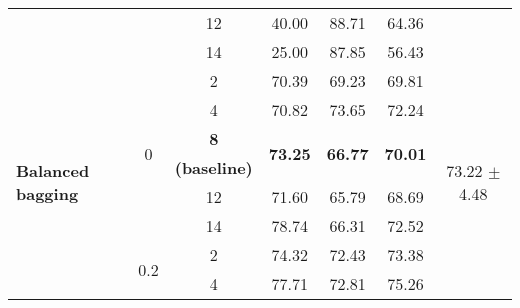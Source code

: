 \begin{sidewaystable}
\begin{adjustbox}{totalheight=0.85\textheight, width=\textwidth, keepaspectratio}
\begin{tabularx}{1.4\textwidth}{Xcccccc}
                                                       &                       & 12                       & 40.00                              & 88.71                           & 64.36                           &                                 \\ 
                                                       &                       & 14                       & 25.00                              & 87.85                           & 56.43                           &                                 \\ 
\multirow{18}{=}{\textbf{Balanced bagging}}            & \multirow{6}{*}{0}    & 2                        & 70.39                           & 69.23                           & 69.81                           & \multirow{18}{*}{73.22 $\pm$ 4.48} \\ 
                                                       &                       & 4                        & 70.82                           & 73.65                           & 72.24                           &                                 \\ 
                                                       &                       & \textbf{8}               & \multirow{2}{*}{\textbf{73.25}} & \multirow{2}{*}{\textbf{66.77}} & \multirow{2}{*}{\textbf{70.01}} &                                 \\
                                                       &                       & \textbf{(baseline)}      &                                 &                                 &                                 &                                 \\ 
                                                       &                       & 12                       & 71.60                            & 65.79                           & 68.69                           &                                 \\ 
                                                       &                       & 14                       & 78.74                           & 66.31                           & 72.52                           &                                 \\ 
                                                       & \multirow{6}{*}{0.2}  & 2                        & 74.32                           & 72.43                           & 73.38                           &                                 \\ 
                                                       &                       & 4                        & 77.71                           & 72.81                           & 75.26                           &                                 \\ 

\end{tabularx}
\end{adjustbox}
\end{sidewaystable}
